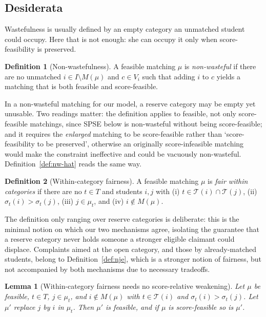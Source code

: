 \documentclass[a4paper,twoside]{article}
\newtheorem{lemma}{Lemma}
\theoremstyle{definition}
\newtheorem{definition}{Definition}
\renewcommand{\T}{\mathcal{T}}
\begin{document}
\subsection{Desiderata}

Wastefulness is usually defined by an empty category an unmatched student could occupy. Here that is not enough: she can occupy it only when score-feasibility is preserved.

\begin{definition}[Non-wastefulness]
\label{def:nw}
A feasible matching $\mu$ is \emph{non-wasteful} if there are no unmatched $i\in I\setminus M(\mu)$ and $c\in V_i$ such that adding $i$ to $c$ yields a matching that is both feasible and score-feasible.
\end{definition}

In a non-wasteful matching for our model, a reserve category may be empty yet unusable. Two readings matter: the definition applies to feasible, not only score-feasible matchings, since SPSE below is non-wasteful without being score-feasible; and it requires the \emph{enlarged} matching to be score-feasible rather than `score-feasibility to be preserved', otherwise an originally score-infeasible matching would make the constraint ineffective and could be vacuously non-wasteful. Definition~\ref{def:nw-hat} reads the same way.

\begin{definition}[Within-category fairness]
\label{def:fair}
A feasible matching $\mu$ is \emph{fair within categories} if there are no $t\in T$ and students $i,j$ with (i) $t\in\T(i)\cap\T(j)$, (ii) $\sigma_t(i)>\sigma_t(j)$, (iii) $j\in\mu_t$, and (iv) $i\notin M(\mu)$.
\end{definition}

The definition only ranging over reserve categories is deliberate: this is the minimal notion on which our two mechanisms agree, isolating the guarantee that a reserve category never holds someone a stronger eligible claimant could displace. Complaints aimed at the open category, and those by already-matched students, belong to Definition~\ref{def:nje}, which is a stronger notion of fairness, but not accompanied by both mechanisms due to necessary tradeoffs.

\begin{lemma}[Within-category fairness needs no score-relative weakening]
\label{lem:fair-sf}
Let $\mu$ be feasible, $t\in T$, $j\in\mu_t$, and $i\notin M(\mu)$ with $t\in\T(i)$ and $\sigma_t(i)>\sigma_t(j)$. Let $\mu'$ replace $j$ by $i$ in $\mu_t$. Then $\mu'$ is feasible, and if $\mu$ is score-feasible so is $\mu'$.
\end{lemma}
\end{document}
